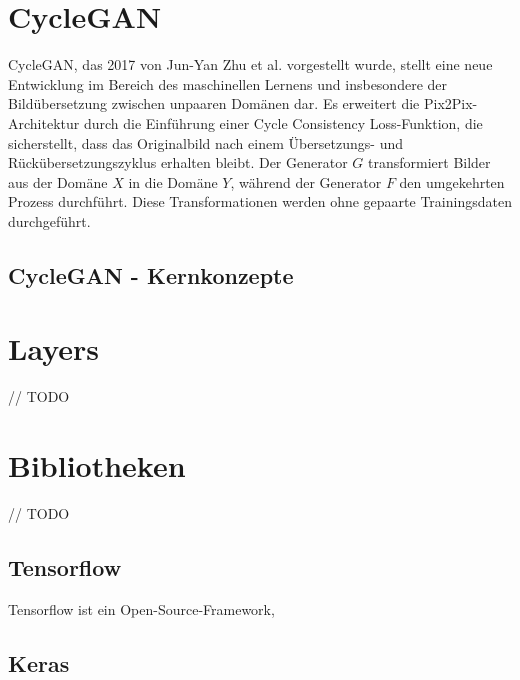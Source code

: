 \section{CycleGAN}
CycleGAN, das 2017 von Jun-Yan Zhu et al. vorgestellt wurde, stellt eine neue Entwicklung im Bereich des maschinellen Lernens und insbesondere der Bildübersetzung zwischen unpaaren Domänen dar. Es erweitert die Pix2Pix-Architektur durch die Einführung einer Cycle Consistency Loss-Funktion, die sicherstellt, dass das Originalbild nach einem Übersetzungs- und Rückübersetzungszyklus erhalten bleibt. Der Generator $G$ transformiert Bilder aus der Domäne $X$ in die Domäne $Y$, während der Generator $F$ den umgekehrten Prozess durchführt. Diese Transformationen werden ohne gepaarte Trainingsdaten durchgeführt.

\subsection{CycleGAN - Kernkonzepte}


\section{Layers}
// TODO

\section{Bibliotheken}
// TODO
\subsection{Tensorflow}
Tensorflow ist ein Open-Source-Framework, 
\subsection{Keras}